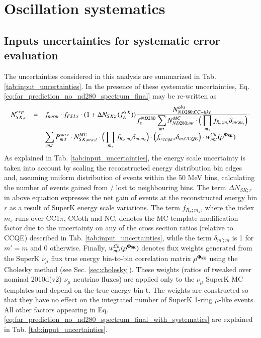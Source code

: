 \section {Oscillation systematics}
\label{sec:eval_osc_systematics}


\subsection {Inputs uncertainties for systematic error evaluation}
\label{sec:systematics_inputs}

The uncertainties considered in this analysis are summarized in Tab. \ref{tab:input_uncertainties}.
In the presence of these systematic uncertainties, Eq. \ref{eq:far_prediction_no_nd280_spectrum_final}
may be re-written as
{
\arraycolsep=2pt
\begin{equation}
\displaystyle
\begin{array}{lcl}
  N_{SK;r}^{exp} & = &
    f_{norm} \cdot f_{FSI;r} \cdot (1+\Delta{N_{SK;r}}(f_{E}^{SK})) 
      \frac{ \displaystyle N^{obs}_{ND280;CC-like} }
           { \displaystyle f_{\epsilon}^{ND280} \sum_{m\prime} N^{MC}_{ND280;m\prime} \cdot 
                \displaystyle \Big( \prod_{m_{s}} f_{R_{\sigma};m_{s}} \delta_{m\prime;m_{s}} \Big) }
    \cdot \\
    & &
    {\displaystyle
    \sum_{m,t}
        P_{m;t}^{surv} \cdot
        N_{SK;m;r;t}^{MC} \cdot
        \Big( \prod_{m_{s}} f_{R_{\sigma};m_{s}} \delta_{m;m_{s}} \Big) \cdot
        \Big( f_{\sigma_{CCQE};t} \delta_{m;CCQE} \Big) \cdot
        w^{Ch.}_{m;t}({\bf \rho^{\Phi_{SK}}})
     }
\end{array}
\label{eq:far_prediction_no_nd280_spectrum_final_with_systematics}
\end{equation}
}
As explained in Tab. \ref{tab:input_uncertainties},
the energy scale uncertainty is taken into account by scaling the reconstructed energy distribution
bin edges and, assuming uniform distribution of events within the 50 MeV bins,
calculating the number of events gained from / lost to neighbouring bins.
The term $\Delta{N_{SK;r}}$ in above equation expresses the net gain of events at the 
reconstructed energy bin $r$ as a result of SuperK energy scale variations. 
The term $f_{R_{\sigma};m_{s}}$,
where the index $m_{s}$ runs over CC1$\pi$, CCoth and NC,
denotes the MC template modification factor due to the uncertainty
on any of the cross section ratios (relative to CCQE) described in Tab. \ref{tab:input_uncertainties},
while the term $\delta_{m\prime;m}$ is 1 for $m\prime=m$ and 0 otherwise.
Finally, $w^{Ch.}_{m;t}({\bf \rho^{\Phi_{SK}}})$ denotes flux weights generated from 
the SuperK $\nu_{\mu}$ flux true energy bin-to-bin correlation matrix ${\bf \rho^{\Phi_{SK}}}$
using the Cholesky method (see Sec. \ref{sec:cholesky}). 
These weights (ratios of tweaked over nominal 2010d(v2) $\nu_{\mu}$ neutrino fluxes)
are applied only to the $\nu_{\mu}$ SuperK MC templates
and depend on the true energy bin t. 
The weights are constructed so that they have no effect on the 
integrated number of SuperK 1-ring $\mu$-like events.
All other factors appearing in Eq. \ref{eq:far_prediction_no_nd280_spectrum_final_with_systematics} 
are explained in Tab. \ref{tab:input_uncertainties}.

